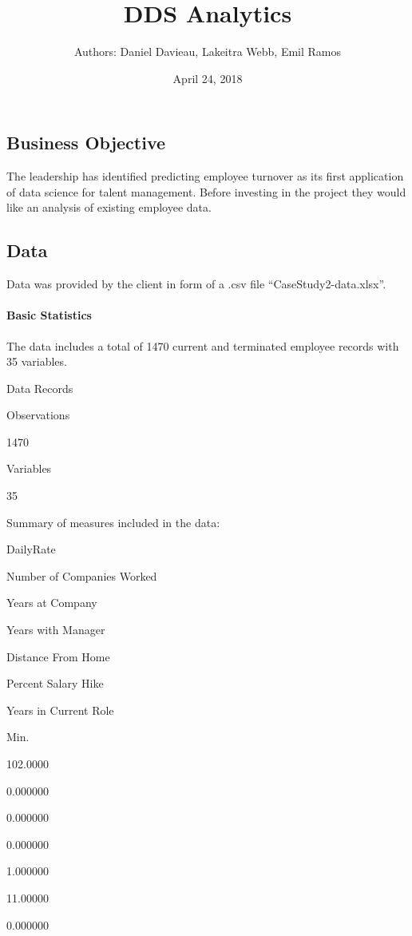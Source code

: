 \documentclass[]{article}
\title{DDS Analytics}
\author{Authors: Daniel Davieau, Lakeitra Webb, Emil Ramos}
\date{April 24, 2018}
\let\oldparagraph\paragraph
\renewcommand{\paragraph}[1]{\oldparagraph{#1}\mbox{}}
\begin{document}
\maketitle

\subsection{Business Objective}\label{business-objective}

The leadership has identified predicting employee turnover as its first
application of data science for talent management. Before investing in
the project they would like an analysis of existing employee data.

\subsection{Data}\label{data}

Data was provided by the client in form of a .csv file
``CaseStudy2-data.xlsx''.

\paragraph{Basic Statistics}\label{basic-statistics}

The data includes a total of 1470 current and terminated employee
records with 35 variables.

Data Records

Observations

1470

Variables

35

Summary of measures included in the data:

DailyRate

Number of Companies Worked

Years at Company

Years with Manager

Distance From Home

Percent Salary Hike

Years in Current Role

Min.

102.0000

0.000000

0.000000

0.000000

1.000000

11.00000

0.000000
\end{document}

